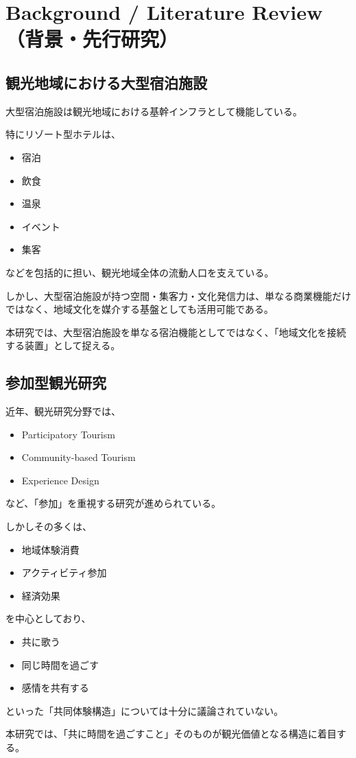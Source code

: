 \section{Background / Literature Review（背景・先行研究）}

\subsection{観光地域における大型宿泊施設}

大型宿泊施設は観光地域における基幹インフラとして機能している。

特にリゾート型ホテルは、

\begin{itemize}
\item 宿泊
\item 飲食
\item 温泉
\item イベント
\item 集客
\end{itemize}

などを包括的に担い、観光地域全体の流動人口を支えている。

しかし、大型宿泊施設が持つ空間・集客力・文化発信力は、単なる商業機能だけではなく、地域文化を媒介する基盤としても活用可能である。

本研究では、大型宿泊施設を単なる宿泊機能としてではなく、「地域文化を接続する装置」として捉える。


\subsection{参加型観光研究}

近年、観光研究分野では、

\begin{itemize}
\item Participatory Tourism
\item Community-based Tourism
\item Experience Design
\end{itemize}

など、「参加」を重視する研究が進められている。

しかしその多くは、

\begin{itemize}
\item 地域体験消費
\item アクティビティ参加
\item 経済効果
\end{itemize}

を中心としており、

\begin{itemize}
\item 共に歌う
\item 同じ時間を過ごす
\item 感情を共有する
\end{itemize}

といった「共同体験構造」については十分に議論されていない。

本研究では、「共に時間を過ごすこと」そのものが観光価値となる構造に着目する。
